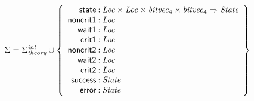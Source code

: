 \documentclass[a4paper]{article}
\def\lthtmlcheckvsize{\ifdim\ht\sizebox<\vsize 
  \ifdim\wd\sizebox<\hsize\expandafter\hfill\fi \expandafter\vfill
  \else\expandafter\vss\fi}%
\begin{document}
{\newpage\clearpage
{}%
$\displaystyle \Sigma = 
\Sigma^{\mathit{int}}_{\mathit{theory}}\cup\left\{
\begin{array}{r@{\>}c@{\>}l}
\mathsf{state} & : & \mathit{Loc} \times \mathit{Loc} \times \mathit{bitvec}_{4} \times \mathit{bitvec}_{4} \Rightarrow \mathit{State}\\
\mathsf{noncrit1} & : & \mathit{Loc}\\
\mathsf{wait1} & : & \mathit{Loc}\\
\mathsf{crit1} & : & \mathit{Loc}\\
\mathsf{noncrit2} & : & \mathit{Loc}\\
\mathsf{wait2} & : & \mathit{Loc}\\
\mathsf{crit2} & : & \mathit{Loc}\\
\mathsf{success} & : & \mathit{State}\\
\mathsf{error} & : & \mathit{State}\\
\end{array}
\right\}
$%
\lthtmlindisplaymathZ
\lthtmlcheckvsize\clearpage}
\end{document}
